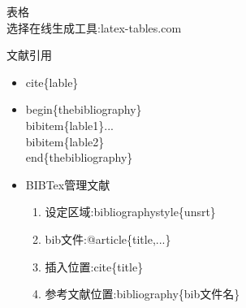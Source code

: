 \documentclass[a4paper,12pt]{article}
\begin{document}
\item 表格\\选择在线生成工具:latex-tables.com
\item 文献引用
          \begin{itemize}
              \item cite\{lable\}
              \item begin\{thebibliography\}\\bibitem\{lable1\}...\\bibitem\{lable2\}\\end\{thebibliography\}
              \item BIBTex管理文献
                    \begin{enumerate}
                        \item 设定区域:bibliographystyle\{unsrt\}
                        \item bib文件:@article\{title,...\}
                        \item 插入位置:cite\{title\}
                        \item 参考文献位置:bibliography\{bib文件名\}
                    \end{enumerate}
          \end{itemize}
\end{document}
